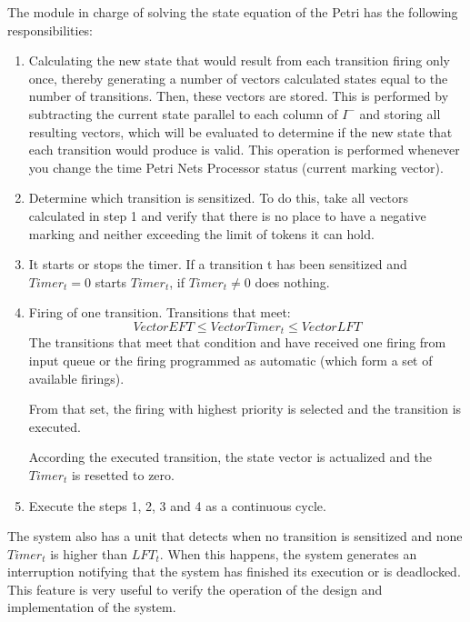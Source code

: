     The module in charge of solving the state equation of the Petri has the following responsibilities:
	\begin{enumerate}
  		\item Calculating the new state that would result from each transition firing only once, thereby 
  		generating a number of vectors calculated states equal to the number of transitions. Then, 
  		these vectors are stored. This is performed by subtracting the current state parallel to each 
  		column of $I^-$ and storing all resulting vectors, which will be evaluated to determine if 
  		the new state that each transition would produce is valid. This operation is performed whenever 
  		you change the time Petri Nets Processor status (current marking vector).
  		\item Determine which transition is sensitized. To do this, take all vectors calculated in 
  		step 1 and verify that there is no place to have a negative marking and neither exceeding the 
  		limit  of tokens it \footnotemark can hold.
  		\item It starts or stops the timer. If a transition t has been sensitized and $Timer_t=0$ 
  		starts $Timer_t$, if $Timer_t\neq0$ does nothing.
  		\item Firing of one transition. Transitions that meet:
  		\begin{equation*}
			Vector EFT \leq Vector Timer_t \leq Vector LFT
		\end{equation*}				
		The transitions that meet that condition and have received one firing from input queue or 
		the firing programmed as automatic (which form a set of available firings).
		
		From that set, the firing with highest priority is selected and the transition is executed.
		
		According the executed transition, the state vector is actualized and the $Timer_t$  is 
		resetted to zero.
		\item Execute the steps 1, 2, 3 and 4 as a continuous cycle.\\
	\end{enumerate}	
	
	
	
	The system also has a unit that detects when no transition is sensitized and none $Timer_t$ 
	is higher than $LFT_t$. When this happens, the system generates an interruption notifying that 
	the system has finished its execution or is deadlocked. This feature is very useful to verify 
	the operation of the design and implementation of the system.
	
    
